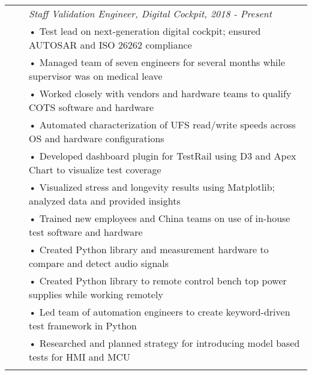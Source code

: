 \documentclass{minimal}
\begin{document}
\begin{tabular}{ p{1.5cm} p{1cm} p{16cm} }
& & \textit{Staff Validation Engineer, Digital Cockpit, 2018 - Present}\\
& & • Test lead on next-generation digital cockpit; ensured AUTOSAR and ISO 26262 compliance\\
& & • Managed team of seven engineers for several months while supervisor was on medical leave\\
& & • Worked closely with vendors and hardware teams to qualify COTS software and hardware\\
& & • Automated characterization of UFS read/write speeds across OS and hardware configurations\\
& & • Developed dashboard plugin for TestRail using D3 and Apex Chart to visualize test coverage\\
& & • Visualized stress and longevity results using Matplotlib; analyzed data and provided insights\\
& & • Trained new employees and China teams on use of in-house test software and hardware\\
& & • Created Python library and measurement hardware to compare and detect audio signals\\
& & • Created Python library to remote control bench top power supplies while working remotely\\
& & • Led team of automation engineers to create keyword-driven test framework in Python\\
& & • Researched and planned strategy for introducing model based tests for HMI and MCU\\
& & \\
\end{tabular}
\end{document}
